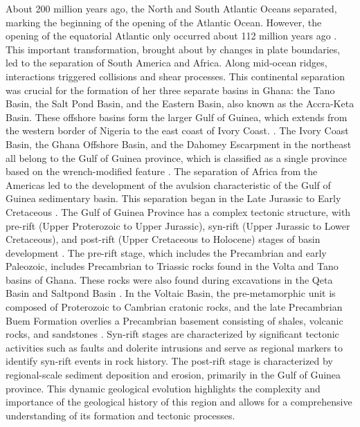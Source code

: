 \documentclass{gji}
\begin{document}
About 200 million years ago, the North and South Atlantic Oceans separated, marking the beginning of the opening of the Atlantic Ocean.
 However, the opening of the equatorial Atlantic only occurred about 112 million years ago \citep{mascle1987evidence,blarez1988shallow,matos1992northeast}.
This important transformation, brought about by changes in plate boundaries, led to the separation of South America and Africa.
 Along mid-ocean ridges, interactions triggered collisions and shear processes.
  This continental separation was crucial for the formation of her three separate basins in Ghana:  the Tano Basin, the Salt Pond Basin, and the Eastern Basin, also known as the Accra-Keta Basin.
 These offshore basins form the larger Gulf of Guinea, which extends from the western border of Nigeria to the east coast of Ivory Coast.
 \citep{brownfield2006geology}.
 The Ivory Coast Basin, the Ghana Offshore Basin, and the Dahomey Escarpment in the northeast all belong to the Gulf of Guinea province, which is classified as a single province based on the wrench-modified feature \citep{brownfield2016assessment}.
 The separation of Africa from the Americas led to the development of the avulsion characteristic of the Gulf of Guinea sedimentary basin.
 This separation began in the Late Jurassic to Early Cretaceous  \citep{adda2013petroleum}.
 The Gulf of Guinea Province has a complex tectonic structure, with pre-rift (Upper Proterozoic to Upper Jurassic), syn-rift (Upper Jurassic to Lower Cretaceous), and post-rift (Upper Cretaceous to Holocene) stages of basin development \citep {brownfield2006geology}.
 The pre-rift stage, which includes the Precambrian and early Paleozoic, includes Precambrian to Triassic rocks found in the Volta and Tano basins of Ghana.
 These rocks were also found during excavations in the Qeta Basin and Saltpond Basin \citep{hayford2008cretaceous}.
 In the Voltaic Basin, the pre-metamorphic unit is composed of Proterozoic to Cambrian cratonic rocks, and the late Precambrian Buem Formation overlies a Precambrian basement consisting of shales, volcanic rocks, and sandstones \citep{carney2010lithostratigraphy}.
 Syn-rift stages are characterized by significant tectonic activities such as faults and dolerite intrusions and serve as regional markers to identify syn-rift events in rock history.
 The post-rift stage is characterized by regional-scale sediment deposition and erosion, primarily in the Gulf of Guinea province.
 This dynamic geological evolution highlights the complexity and importance of the geological history of this region and allows for a comprehensive understanding of its formation and tectonic processes.
\end{document}
